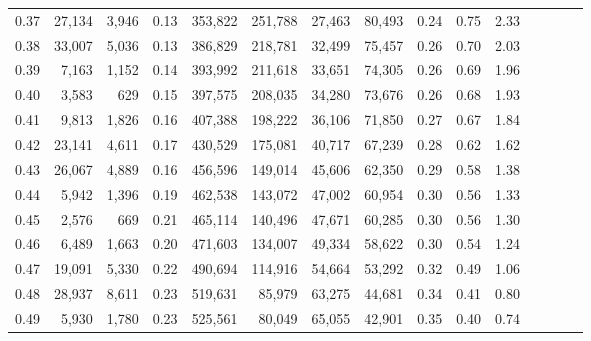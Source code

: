 \begin{tabular}{rrrcrrrrrrrrrrr}
0.37 &  27,134 &  3,946 &                                       0.13 &  353,822 &  251,788 &   27,463 &   80,493 &  0.24 &  0.75 &                         2.33 \\
0.38 &  33,007 &  5,036 &                                       0.13 &  386,829 &  218,781 &   32,499 &   75,457 &  0.26 &  0.70 &                         2.03 \\
0.39 &   7,163 &  1,152 &                                       0.14 &  393,992 &  211,618 &   33,651 &   74,305 &  0.26 &  0.69 &                         1.96 \\
0.40 &   3,583 &    629 &                                       0.15 &  397,575 &  208,035 &   34,280 &   73,676 &  0.26 &  0.68 &                         1.93 \\
0.41 &   9,813 &  1,826 &                                       0.16 &  407,388 &  198,222 &   36,106 &   71,850 &  0.27 &  0.67 &                         1.84 \\
0.42 &  23,141 &  4,611 &                                       0.17 &  430,529 &  175,081 &   40,717 &   67,239 &  0.28 &  0.62 &                         1.62 \\
0.43 &  26,067 &  4,889 &                                       0.16 &  456,596 &  149,014 &   45,606 &   62,350 &  0.29 &  0.58 &                         1.38 \\
0.44 &   5,942 &  1,396 &                                       0.19 &  462,538 &  143,072 &   47,002 &   60,954 &  0.30 &  0.56 &                         1.33 \\
0.45 &   2,576 &    669 &                                       0.21 &  465,114 &  140,496 &   47,671 &   60,285 &  0.30 &  0.56 &                         1.30 \\
0.46 &   6,489 &  1,663 &                                       0.20 &  471,603 &  134,007 &   49,334 &   58,622 &  0.30 &  0.54 &                         1.24 \\
0.47 &  19,091 &  5,330 &                                       0.22 &  490,694 &  114,916 &   54,664 &   53,292 &  0.32 &  0.49 &                         1.06 \\
0.48 &  28,937 &  8,611 &                                       0.23 &  519,631 &   85,979 &   63,275 &   44,681 &  0.34 &  0.41 &                         0.80 \\
0.49 &   5,930 &  1,780 &                                       0.23 &  525,561 &   80,049 &   65,055 &   42,901 &  0.35 &  0.40 &                         0.74 \\

\end{tabular}
